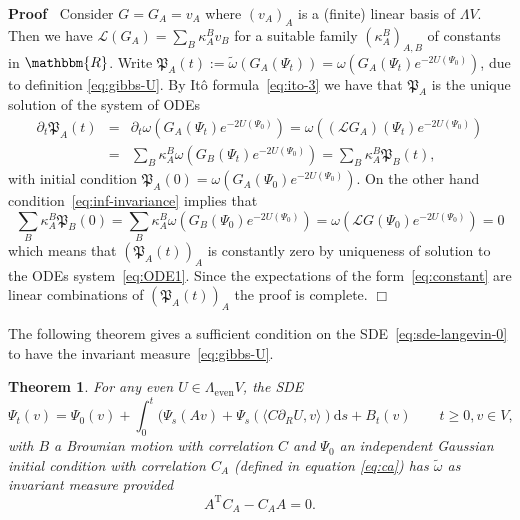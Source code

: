 \documentclass[11pt]{article}
\newcommand{\Tau}{\mathrm{T}}
\newcommand{\assign}{:=}
\newcommand{\mathd}{\mathrm{d}}
\newcommand{\nobracket}{}
\newcommand{\tmop}[1]{\ensuremath{\operatorname{#1}}}
\newenvironment{proof}{\noindent\textbf{Proof\ }}{\hspace*{\fill}$\Box$\medskip}
\newtheorem{theorem}{Theorem}
\begin{document}
\begin{proof}
  Consider $G = G_A = v_A$ where $(v_A)_A$ is a (finite) linear basis of
  $\Lambda V$. Then we have $\mathcal{L} (G_A) = \sum_B \kappa_A^B v_B$ for a
  suitable family $(\kappa_A^B)_{A, B}$ of constants in $\mathbbm{R}$. Write
  $\mathfrak{P}_A (t) \assign \tilde{\omega} (G_A (\Psi_t)) = \omega (G_A
  (\Psi_t) e^{- 2 U (\Psi_0)})$, due to definition {\eqref{eq:gibbs-U}}. By
  It{\^o} formula~{\eqref{eq:ito-3}} we have that $\mathfrak{P}_A$ is the
  unique solution of the system of ODEs
  \begin{eqnarray}
    \partial_t \mathfrak{P}_A (t) & = & \partial_t \omega (G_A (\Psi_t) e^{- 2
    U (\Psi_0)}) = \omega ((\mathcal{L} G_A) (\Psi_t) e^{- 2 U (\Psi_0)})
    \nonumber\\
    & = & \sum_B \kappa_A^B \omega (G_B (\Psi_t) e^{- 2 U (\Psi_0)}) = \sum_B
    \kappa^B_A \mathfrak{P}_B (t), \label{eq:ODE1} 
  \end{eqnarray}
  with initial condition $\mathfrak{P}_A (0) = \omega (G_A (\Psi_0) e^{- 2 U
  (\Psi_0)})$. On the other hand condition~{\eqref{eq:inf-invariance}} implies
  that
  \[ \sum_B \kappa^B_A \mathfrak{P}_B (0) = \sum_B \kappa^B_A \omega (G_B
     (\Psi_0) e^{- 2 U (\Psi_0)}) = \omega (\mathcal{L}G (\Psi_0) e^{- 2 U
     (\Psi_0)}) = 0 \]
  which means that $(\mathfrak{P}_A (t))_A$ is constantly zero by uniqueness
  of solution to the ODEs system~{\eqref{eq:ODE1}}. Since the expectations of
  the form~{\eqref{eq:constant}} are linear combinations of $(\mathfrak{P}_A
  (t))_A$ the proof is complete.
\end{proof}

The following theorem gives a sufficient condition on the
SDE~{\eqref{eq:sde-langevin-0}} to have the invariant
measure~{\eqref{eq:gibbs-U}}.

\begin{theorem}
  \label{th:sq-finite}For any even $U \in \Lambda_{\tmop{even}} V$, the SDE
  \begin{equation}
    \Psi_t (v) = \Psi_0 (v) + \int_0^t (\Psi_s (A v) + \Psi_s (\langle C
    \partial_R U, v \rangle) \nobracket \mathd s + B_t (v) \qquad t \geqslant
    0, v \in V, \label{eq:sde-langevin}
  \end{equation}
  with $B$ a Brownian motion with correlation $C$ and $\Psi_0$ an independent
  Gaussian initial condition with correlation $C_A$ (defined in equation
  {\eqref{eq:ca}}) has $\tilde{\omega}$ as invariant measure provided
  \begin{equation}
    A^{\Tau} C_A - C_A A = 0. \label{eq:gradient}
  \end{equation}
\end{theorem}
\end{document}
